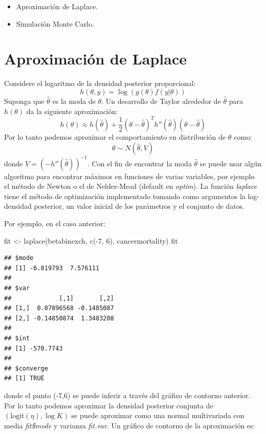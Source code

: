 \documentclass[
  12pt,
]{book}
\newenvironment{Shaded}{\begin{snugshade}}{\end{snugshade}}
\newcommand{\DecValTok}[1]{\textcolor[rgb]{0.00,0.00,0.81}{#1}}
\newcommand{\FunctionTok}[1]{\textcolor[rgb]{0.00,0.00,0.00}{#1}}
\newcommand{\NormalTok}[1]{#1}
\newcommand{\OtherTok}[1]{\textcolor[rgb]{0.56,0.35,0.01}{#1}}
\newcommand{\SpecialCharTok}[1]{\textcolor[rgb]{0.00,0.00,0.00}{#1}}
\providecommand{\tightlist}{%
  \setlength{\itemsep}{0pt}\setlength{\parskip}{0pt}}
\begin{document}
\begin{itemize}
\tightlist
\item
  Aproximación de Laplace.
\item
  Simulación Monte Carlo.
\end{itemize}

\hypertarget{aproximaciuxf3n-de-laplace}{%
\section{Aproximación de Laplace}\label{aproximaciuxf3n-de-laplace}}

Considere el logaritmo de la densidad posterior proporcional:
\[h(\theta,y)=\log(g(\theta)f(y|\theta))\] Suponga que \(\hat \theta\)
es la moda de \(\theta\). Un desarrollo de Taylor alrededor de
\(\hat \theta\) para \(h(\theta)\) da la siguiente aproximación:
\[h(\theta)\approx h(\hat \theta)+\frac 1 2(\theta-\hat \theta)^Th''(\hat \theta)(\theta-\hat \theta)\]
Por lo tanto podemos aproximar el comportamiento en distribución de
\(\theta\) como: \[\theta \sim N(\hat \theta,V)\] donde
\(V=(-h''(\hat \theta))^{-1}\). Con el fin de encontrar la moda
\(\hat \theta\) se puede usar algún algoritmo para encontrar máximos en
funciones de varias variables, por ejemplo el método de Newton o el de
Nelder-Mead (default en \emph{optim}). La función \emph{laplace} tiene
el método de optimización implementado tomando como argumentos la
log-densidad posterior, un valor inicial de los parámetros y el conjunto
de datos.

Por ejemplo, en el caso anterior:

\begin{Shaded}
\begin{Highlighting}[]
\NormalTok{fit }\OtherTok{\textless{}{-}} \FunctionTok{laplace}\NormalTok{(betabinexch, }\FunctionTok{c}\NormalTok{(}\SpecialCharTok{{-}}\DecValTok{7}\NormalTok{, }\DecValTok{6}\NormalTok{), cancermortality)}
\NormalTok{fit}
\end{Highlighting}
\end{Shaded}

\begin{verbatim}
## $mode
## [1] -6.819793  7.576111
## 
## $var
##             [,1]       [,2]
## [1,]  0.07896568 -0.1485087
## [2,] -0.14850874  1.3483208
## 
## $int
## [1] -570.7743
## 
## $converge
## [1] TRUE
\end{verbatim}

donde el punto (-7,6) se puede inferir a través del gráfico de contorno
anterior. Por lo tanto podemos aproximar la densidad posterior conjunta
de \((\text{logit}(\eta),\log K)\) se puede aproximar como una normal
multivariada con media \emph{fit\$mode} y varianza \emph{fit.var}. Un
gráfico de contorno de la aproximación es:
\end{document}
